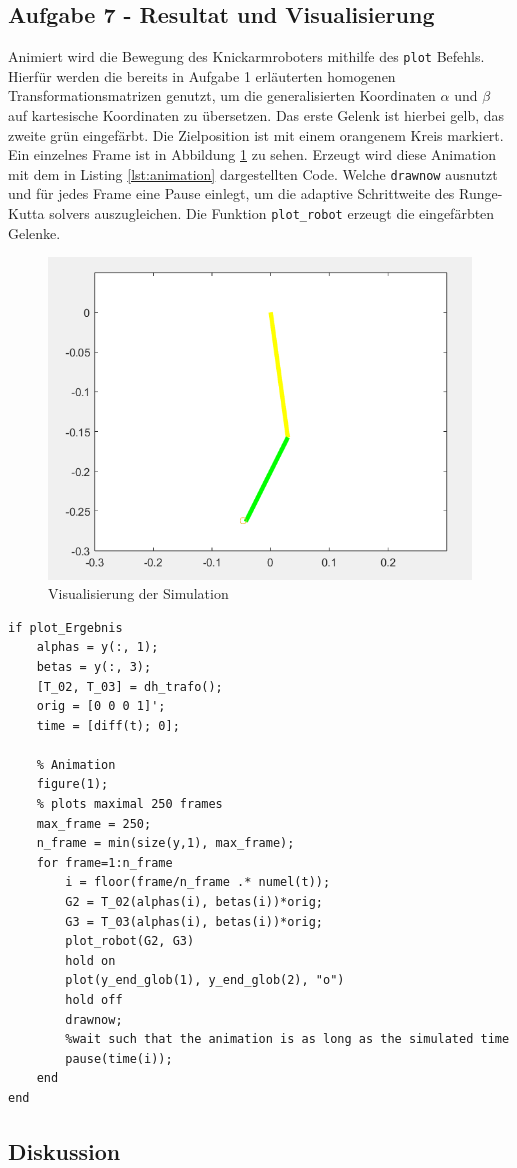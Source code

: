 \subsection*{Aufgabe 7 - Resultat und Visualisierung}

Animiert wird die Bewegung des Knickarmroboters mithilfe des \texttt{plot} Befehls. Hierfür werden die bereits in Aufgabe 1 erläuterten homogenen Transformationsmatrizen genutzt, um die generalisierten Koordinaten $\alpha$ und $\beta$ auf kartesische Koordinaten zu übersetzen. Das erste Gelenk ist hierbei gelb, das zweite grün eingefärbt. Die Zielposition ist mit einem orangenem Kreis markiert. Ein einzelnes Frame ist in Abbildung \ref{fig:visualisierung} zu sehen. Erzeugt wird diese Animation mit dem in Listing \ref{lst:animation} dargestellten Code. Welche \texttt{drawnow} ausnutzt und für jedes Frame eine Pause einlegt, um die adaptive Schrittweite des Runge-Kutta solvers auszugleichen. Die Funktion \texttt{plot\_robot} erzeugt die eingefärbten Gelenke.

\begin{figure}[H]
    \centering
    \includegraphics[width=0.8\linewidth]{img/visualisierung.png}
    \caption{Visualisierung der Simulation}
    \label{fig:visualisierung}
\end{figure}




\begin{lstlisting}[caption={Definition der rechten Seite},label={lst:animation}]
    %% Visualization
if plot_Ergebnis
    alphas = y(:, 1);
    betas = y(:, 3);
    [T_02, T_03] = dh_trafo();
    orig = [0 0 0 1]';
    time = [diff(t); 0];
    
    % Animation
    figure(1);
    % plots maximal 250 frames
    max_frame = 250;
    n_frame = min(size(y,1), max_frame);
    for frame=1:n_frame
        i = floor(frame/n_frame .* numel(t));
        G2 = T_02(alphas(i), betas(i))*orig;
        G3 = T_03(alphas(i), betas(i))*orig;
        plot_robot(G2, G3)
        hold on
        plot(y_end_glob(1), y_end_glob(2), "o")
        hold off
        drawnow;
        %wait such that the animation is as long as the simulated time
        pause(time(i));
    end
end
\end{lstlisting}




\subsection*{Diskussion}